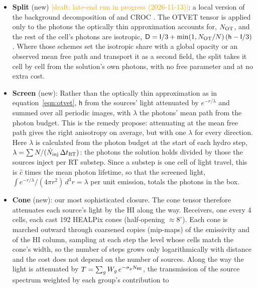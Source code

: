 \documentclass[11pt]{article}
\newcommand{\draft}[1]{\textcolor{orange}{[draft: #1]}}
\newcommand{\chat}{\hat{c}}
\begin{document}
\begin{itemize}
{  $\Delta z\approx1$ after overlap, $\Lambda$ reaches 0.95--0.99 and the
  background brings the $\Gamma$ power from 14--16 to 1.2--1.5 times the
  rays' (split 1.0--1.1), but 0.3--0.5 in $z$ after overlap it is still
  3--4 times; keep?}
\item \textbf{Split} (new) \draft{late-end run in progress (2026-11-13)}: a local version of the background
  decomposition of \citet{gnedin01} and CROC \citep{gnedin14}. The OTVET
  tensor is applied only to the photons the optically thin approximation
  accounts for, $N_{\rm OT}$, and the rest of the cell's photons are
  isotropic, $\mathsf D=\mathsf I/3+\min(1,N_{\rm OT}/N)\,(\mathsf h-\mathsf I/3)$.
  Where those schemes set the isotropic share with a global opacity or an
  observed mean free path and transport it as a second field, the split
  takes it cell by cell from the solution's own photons, with no free
  parameter and at no extra cost.
\item \textbf{Screen} (new): Rather than the optically thin approximation as in equation~\ref{eqn:otvet}, $\mathsf h$ from the sources' light
  attenuated by $e^{-r/\lambda}$ and summed over all periodic images, with
  $\lambda$ the photons' mean path from the photon budget. This is the
  remedy \citet{wu21} propose: attenuating at the mean free path gives the
  right anisotropy on average, but with one $\lambda$ for every
  direction.  Here $\lambda$ is calculated from the photon budget at the start of each
hydro step, $\lambda=\sum N/(\dot N_{\rm inj}\,\Delta t_{\rm RT})$: the
photons the solution holds divided by those the sources inject per RT
substep. Since a substep is one cell of light travel, this is $\chat$
times the mean photon lifetime, so that the screened light,
$\int e^{-r/\lambda}/(4\pi r^2)\,d^3r=\lambda$ per unit emission, totals
the photons in the box.
\item \textbf{Cone} (new): our most sophisticated closure. The cone tensor therefore attenuates
  each source's light by the HI along the way. Receivers, one every 4
  cells, each cast 192 HEALPix cones (half-opening $\approx8^\circ$). Each
  cone is marched outward through coarsened copies (mip-maps) of the
  emissivity and of the HI column, sampling at each step the level whose
  cells match the cone's width, so the number of steps grows only
  logarithmically with distance and the cost does not depend on the
  number of sources. Along the way the light is attenuated by
  $T=\sum_g W_g\,e^{-\sigma_g N_{\rm HI}}$, the transmission of the
  source spectrum weighted by each group's contribution to

\end{itemize}
\end{document}
